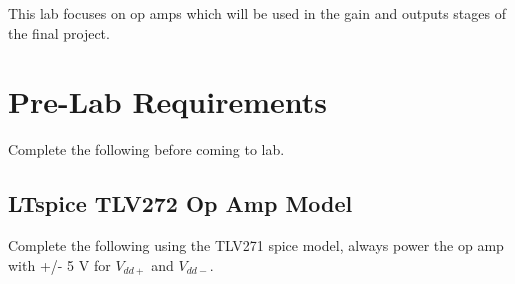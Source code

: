 This lab focuses on op amps which will be used in the gain and outputs stages of the final project. 

\section{Pre-Lab Requirements}

Complete the following before coming to lab. 

\subsection{LTspice TLV272 Op Amp Model} \label{ssec:opampmodel}

Complete the following using the TLV271 spice model, always power the op amp with +/- 5 V for $V_{dd+}$ and $V_{dd-}$.

